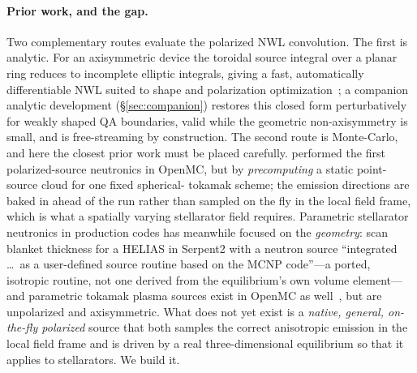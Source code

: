 \documentclass[11pt]{article}
\begin{document}
\paragraph{Prior work, and the gap.}
Two complementary routes evaluate the polarized NWL convolution. The first is analytic. For
an axisymmetric device the toroidal source integral over a planar ring reduces to
incomplete elliptic integrals, giving a fast, automatically differentiable NWL suited to
shape and polarization optimization~\cite{schwartz2025}; a companion analytic development
(\S\ref{sec:companion}) restores this closed form perturbatively for weakly shaped QA
boundaries, valid while the geometric non-axisymmetry is small, and is free-streaming by
construction. The second route is Monte-Carlo, and here the closest prior work must be
placed carefully. \cite{bae2025} performed the first polarized-source neutronics in
OpenMC, but by \emph{precomputing} a static point-source cloud for one fixed spherical-
tokamak scheme; the emission directions are baked in ahead of the run rather than sampled
on the fly in the local field frame, which is what a spatially varying stellarator field
requires. Parametric stellarator neutronics in production codes has meanwhile focused on
the \emph{geometry}: \cite{lyytinen2024} scan blanket thickness for a HELIAS in Serpent2
with a neutron source ``integrated \dots\ as a user-defined source routine based on the
MCNP code''---a ported, isotropic routine, not one derived from the equilibrium's own
volume element---and parametric tokamak plasma sources exist in OpenMC as
well~\cite{peterson_tokamaksource}, but are unpolarized and axisymmetric. What does not yet
exist is a \emph{native, general, on-the-fly polarized} source that both samples the
correct anisotropic emission in the local field frame and is driven by a real
three-dimensional equilibrium so that it applies to stellarators. We build it.
\end{document}

